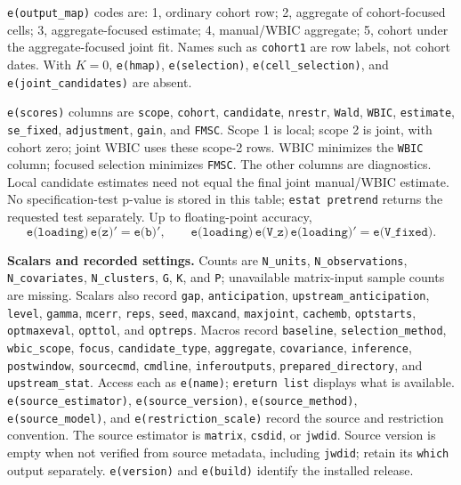 \documentclass[11pt]{article}
\newcommand{\cmd}[1]{\texttt{#1}}
\begin{document}
\cmd{e(output\_map)} codes are: 1, ordinary cohort row; 2, aggregate of
cohort-focused cells; 3, aggregate-focused estimate; 4, manual/WBIC aggregate;
5, cohort under the aggregate-focused joint fit. Names such as \cmd{cohort1}
are row labels, not cohort dates. With $K=0$, \cmd{e(hmap)},
\cmd{e(selection)}, \cmd{e(cell\_selection)}, and
\cmd{e(joint\_candidates)} are absent.

\cmd{e(scores)} columns are \cmd{scope}, \cmd{cohort}, \cmd{candidate},
\cmd{nrestr}, \cmd{Wald}, \cmd{WBIC}, \cmd{estimate}, \cmd{se\_fixed},
\cmd{adjustment}, \cmd{gain}, and \cmd{FMSC}. Scope 1 is local; scope 2 is
joint, with cohort zero; joint WBIC uses these scope-2 rows. WBIC minimizes
the \cmd{WBIC} column; focused selection minimizes \cmd{FMSC}. The other
columns are diagnostics. Local candidate estimates need not equal the final
joint manual/WBIC estimate. No specification-test p-value is stored in this
table; \cmd{estat pretrend} returns the requested test separately. Up to floating-point accuracy,
\[
 \cmd{e(loading)}\,\cmd{e(z)}'=\cmd{e(b)}',\qquad
 \cmd{e(loading)}\,\cmd{e(V\_z)}\,\cmd{e(loading)}'=\cmd{e(V\_fixed)}.
\]

\textbf{Scalars and recorded settings.}
Counts are \cmd{N\_units}, \cmd{N\_observations}, \cmd{N\_covariates},
\cmd{N\_clusters}, \cmd{G}, \cmd{K}, and \cmd{P}; unavailable matrix-input
sample counts are missing. Scalars also record \cmd{gap}, \cmd{anticipation},
\cmd{upstream\_anticipation}, \cmd{level}, \cmd{gamma}, \cmd{mcerr},
\cmd{reps}, \cmd{seed}, \cmd{maxcand}, \cmd{maxjoint}, \cmd{cachemb},
\cmd{optstarts}, \cmd{optmaxeval}, \cmd{opttol}, and \cmd{optreps}.
Macros record \cmd{baseline}, \cmd{selection\_method}, \cmd{wbic\_scope}, \cmd{focus},
\cmd{candidate\_type}, \cmd{aggregate}, \cmd{covariance}, \cmd{inference},
\cmd{postwindow}, \cmd{sourcecmd}, \cmd{cmdline}, \cmd{inferoutputs},
\cmd{prepared\_directory}, and \cmd{upstream\_stat}. Access each as
\cmd{e(name)}; \cmd{ereturn list} displays what is available.
\cmd{e(source\_estimator)}, \cmd{e(source\_version)},
\cmd{e(source\_method)}, \cmd{e(source\_model)}, and
\cmd{e(restriction\_scale)} record the source and restriction convention.
The source estimator is \cmd{matrix}, \cmd{csdid}, or \cmd{jwdid}.
Source version is empty when not verified from source metadata, including
\cmd{jwdid}; retain its \cmd{which} output separately.
\cmd{e(version)} and \cmd{e(build)} identify the installed release.
\end{document}
